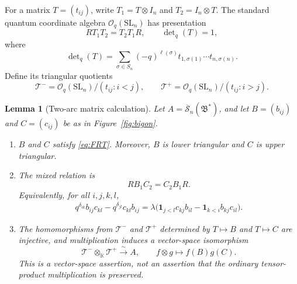 \documentclass[11pt]{article}
\newtheorem{lemma}[theorem]{Lemma}
\theoremstyle{remark}
\newcommand{\kk}{\mathbb{K}}
\newcommand{\OO}{\mathcal O_q(\mathrm{SL}_n)}
\newcommand{\rSk}{\overline{\mathscr S}_n}
\newcommand{\Bstar}{\mathfrak B^{*}}
\newcommand{\ind}{\mathbf 1}
\begin{document}
For a matrix $T=(t_{ij})$, write
$T_1=T\otimes I_n$ and $T_2=I_n\otimes T$.
The standard quantum coordinate algebra $\OO$ has presentation
\begin{equation}\label{eq:FRT}
 RT_1T_2=T_2T_1R,\qquad
 \det\nolimits_q(T)=1,
\end{equation}
where
\[
 \det\nolimits_q(T)
   =\sum_{\sigma\in S_n}(-q)^{\ell(\sigma)}
       t_{1,\sigma(1)}\cdots t_{n,\sigma(n)}.
\]
Define its triangular quotients
\begin{equation}\label{eq:triangular-algebras}
 \mathcal T^-=\OO/(t_{ij}:i<j),
 \qquad
 \mathcal T^+=\OO/(t_{ij}:i>j).
\end{equation}

\begin{lemma}[Two-arc matrix calculation]\label{lem:skein}
Let $A=\rSk(\Bstar)$, and let
$B=(b_{ij})$ and $C=(c_{ij})$ be as in
Figure~\ref{fig:bigon}.
\begin{enumerate}
\item
$B$ and $C$ satisfy \eqref{eq:FRT}.  Moreover, $B$ is lower
triangular and $C$ is upper triangular.
\item
The mixed relation is
\begin{equation}\label{eq:mixed-matrix}
 RB_1C_2=C_2B_1R.
\end{equation}
Equivalently, for all $i,j,k,l$,
\begin{equation}\label{eq:mixed-components}
 \begin{split}
 q^{\delta_{ik}}b_{ij}c_{kl}
 -q^{\delta_{jl}}c_{kl}b_{ij}
 =\lambda\bigl(
       \ind_{j<l}c_{kj}b_{il}
       -\ind_{k<i}b_{kj}c_{il}
     \bigr).
 \end{split}
\end{equation}
\item
The homomorphisms from $\mathcal T^-$ and $\mathcal T^+$ determined
by $T\mapsto B$ and $T\mapsto C$ are injective, and multiplication
induces a vector-space isomorphism
\begin{equation}\label{eq:skein-factorization}
 \mathcal T^-\otimes_\kk\mathcal T^+
       \xrightarrow{\ \sim\ } A,\qquad
 f\otimes g\longmapsto f(B)g(C).
\end{equation}
This is a vector-space assertion, not an assertion that the
ordinary tensor-product multiplication is preserved.
\end{enumerate}
\end{lemma}
\end{document}
